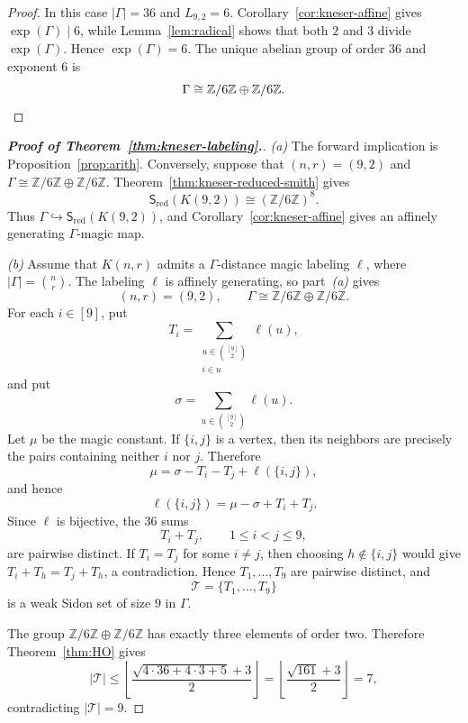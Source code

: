 \documentclass[11pt,reqno]{amsart}
\theoremstyle{plain}
\theoremstyle{definition}
\theoremstyle{remark}
\DeclareMathOperator{\ex}{exp}
\newcommand{\Sred}{\mathsf S_{\mathrm{red}}}
\begin{document}
\begin{proof}
In this case $|\Gamma|=36$ and $L_{9,2}=6$. Corollary~\ref{cor:kneser-affine}
gives $\ex(\Gamma)\mid6$, while Lemma~\ref{lem:radical} shows that both $2$ and
$3$ divide $\ex(\Gamma)$. Hence $\ex(\Gamma)=6$. The unique abelian group of
order $36$ and exponent $6$ is
\[
  \Gamma\cong\mathbb Z/6\mathbb Z\oplus\mathbb Z/6\mathbb Z.\qedhere
\]
\end{proof}

\begin{proof}[\textnormal{\textbf{Proof of Theorem~\ref{thm:kneser-labeling}.}}]
\emph{(a)} The forward implication is Proposition~\ref{prop:arith}. Conversely, suppose
that $(n,r)=(9,2)$ and
$\Gamma\cong\mathbb Z/6\mathbb Z\oplus\mathbb Z/6\mathbb Z$.
Theorem~\ref{thm:kneser-reduced-smith} gives
\[
  \Sred(K(9,2))
  \cong
  (\mathbb Z/6\mathbb Z)^8.
\]
Thus $\Gamma\hookrightarrow\Sred(K(9,2))$, and
Corollary~\ref{cor:kneser-affine} gives an affinely generating
$\Gamma$-magic map.

\medskip
\noindent\emph{(b)} Assume that $K(n,r)$ admits a $\Gamma$-distance magic labeling $\ell$, where
$|\Gamma|=\binom{n}{r}$. The labeling $\ell$ is affinely generating, so
part~\emph{(a)} gives
\[
  (n,r)=(9,2),\qquad
  \Gamma\cong\mathbb Z/6\mathbb Z\oplus\mathbb Z/6\mathbb Z.
\]
For each $i\in[9]$, put
\[
  T_i=\sum_{\substack{u\in\binom{[9]}2\\i\in u}}\ell(u),
\]
and put
\[
  \sigma=\sum_{u\in\binom{[9]}2}\ell(u).
\]
Let $\mu$ be the magic constant. If $\{i,j\}$ is a vertex, then its
neighbors are precisely the pairs containing neither $i$ nor $j$. Therefore
\[
  \mu=\sigma-T_i-T_j+\ell(\{i,j\}),
\]
and hence
\[
  \ell(\{i,j\})=\mu-\sigma+T_i+T_j.
\]
Since $\ell$ is bijective, the $36$ sums
\[
  T_i+T_j,\qquad 1\le i<j\le9,
\]
are pairwise distinct. If $T_i=T_j$ for some $i\ne j$, then choosing
$h\notin\{i,j\}$ would give $T_i+T_h=T_j+T_h$, a contradiction. Hence
$T_1,\dots,T_9$ are pairwise distinct, and
\[
  \mathcal T=\{T_1,\dots,T_9\}
\]
is a weak Sidon set of size $9$ in $\Gamma$.

The group $\mathbb Z/6\mathbb Z\oplus\mathbb Z/6\mathbb Z$ has exactly three
elements of order two. Therefore
Theorem~\ref{thm:HO} gives
\[
  |\mathcal T|
  \le
  \left\lfloor
    \frac{\sqrt{4\cdot36+4\cdot3+5}+3}{2}
  \right\rfloor
  =\left\lfloor\frac{\sqrt{161}+3}{2}\right\rfloor
  =7,
\]
contradicting $|\mathcal T|=9$.
\end{proof}

\end{document}
